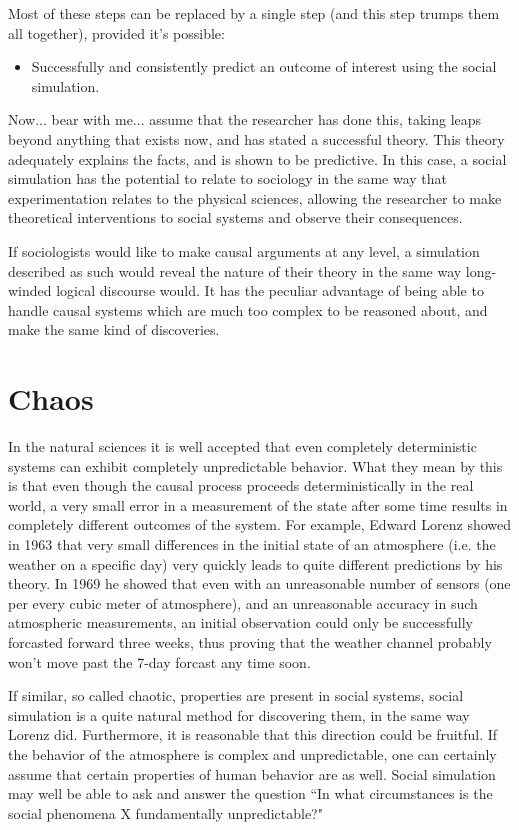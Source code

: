 \documentclass[]{article}
\begin{document}
	Most of these steps can be replaced by a single step (and this step trumps them all together), provided it's possible:
	\begin{itemize}
		\item Successfully and consistently predict an outcome of interest using the social simulation.
	\end{itemize}

	Now... bear with me... assume that the researcher has done this, taking leaps beyond anything that exists now, and has stated a successful theory. This theory adequately explains the facts, and is shown to be predictive.
	In this case, a social simulation has the potential to relate to sociology in the same way that experimentation relates to the physical sciences, allowing the researcher to make theoretical interventions to social systems and observe their consequences.
	
	If sociologists would like to make causal arguments at any level, a simulation described as such would reveal the nature of their theory in the same way long-winded logical discourse would.
	It has the peculiar advantage of being able to handle causal systems which are much too complex to be reasoned about, and make the same kind of discoveries.
	
	\section{Chaos}
	In the natural sciences it is well accepted that even completely deterministic systems can exhibit completely unpredictable behavior.
	What they mean by this is that even though the causal process proceeds deterministically in the real world, a very small error in a measurement of the state after some time results in completely different outcomes of the system.
	For example, Edward Lorenz showed in 1963 \cite{Lorenz1963} that very small differences in the initial state of an atmosphere (i.e. the weather on a specific day) very quickly leads to quite different predictions by his theory.
	In 1969 he showed that even with an unreasonable number of sensors (one per every cubic meter of atmosphere), and an unreasonable accuracy in such atmospheric measurements, an initial observation could only be successfully forcasted forward three weeks, thus proving that the weather channel probably won't move past the 7-day forcast any time soon.
	
	If similar, so called chaotic, properties are present in social systems, social simulation is a quite natural method for discovering them, in the same way Lorenz did.
	Furthermore, it is reasonable that this direction could be fruitful.
	If the behavior of the atmosphere is complex and unpredictable, one can certainly assume that certain properties of human behavior are as well.
	Social simulation may well be able to ask and answer the question ``In what circumstances is the social phenomena X fundamentally unpredictable?"
	
\end{document}
